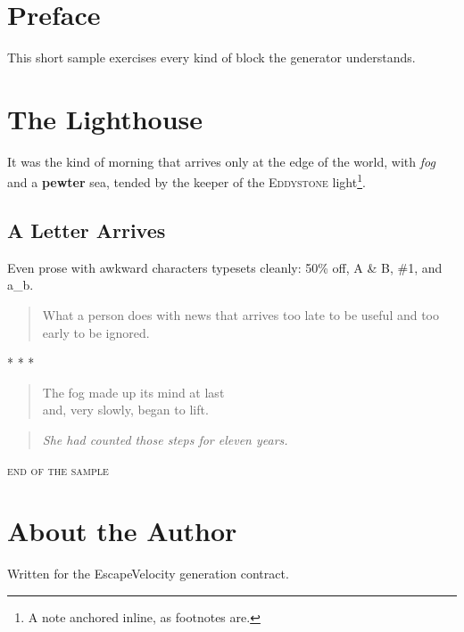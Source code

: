 \documentclass[11pt,twoside,openright]{memoir}
\begin{document}
\frontmatter

\chapter{Preface}

This short sample exercises every kind of block the generator understands.

\mainmatter

\chapter{The Lighthouse}

It was the kind of morning that arrives only at the edge of the world, with \emph{fog} and a \textbf{pewter} sea, tended by the keeper of the \textsc{Eddystone} light\footnote{A note anchored inline, as footnotes are.}.

\section{A Letter Arrives}

Even prose with awkward characters typesets cleanly: 50\% off, A \& B, \#1, and a\_b.

\begin{quotation}
What a person does with news that arrives too late to be useful and too early to be ignored.
\end{quotation}

\begin{center}* * *\end{center}

\begin{verse}
The fog made up its mind at last \\
and, very slowly, began to lift.
\end{verse}

\begin{quote}\itshape
She had counted those steps for eleven years.
\end{quote}

\begin{center}\textsc{end of the sample}\end{center}

\backmatter

\chapter{About the Author}

Written for the EscapeVelocity generation contract.
\end{document}
